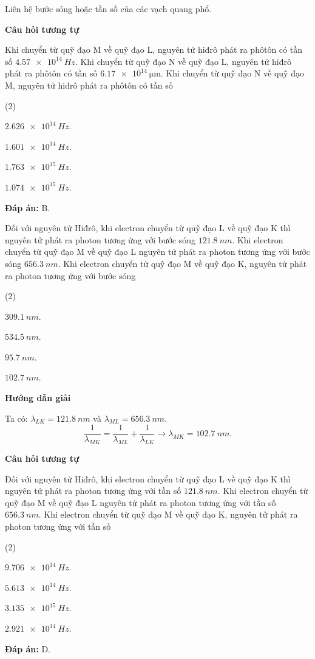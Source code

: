 \begin{dang}{Liên hệ bước sóng hoặc tần số của các vạch quang phổ.}
{		\begin{center}
			\textbf{Câu hỏi tương tự}
		\end{center}
		
		Khi chuyển từ quỹ đạo M về quỹ đạo L, nguyên tử hiđrô phát ra phôtôn có tần số $ \SI{4,57 e14}{Hz} $. Khi chuyển từ quỹ đạo N về quỹ đạo L, nguyên tử hiđrô phát ra phôtôn có tần số $\SI{6,17 e14}{\micro \meter}$. Khi chuyển từ quỹ đạo N về quỹ đạo M, nguyên tử hiđrô phát ra phôtôn có tần số
		\begin{mcq}(2)
			\item $ \SI{2,626 e14}{Hz} $.
			\item $ \SI{1,601 e14}{Hz} $.
			\item $ \SI{1,763 e15}{Hz} $.
			\item $ \SI{1,074 e15}{Hz} $.
		\end{mcq}
		
		\textbf{Đáp án:} B.}
	
	{
		Đối với nguyên tử Hiđrô, khi electron chuyển từ quỹ đạo L về quỹ đạo K thì nguyên tử phát ra photon tương ứng với bước sóng $ \SI{121,8}{nm} $. Khi electron chuyển từ quỹ đạo M về quỹ đạo L nguyên tử phát ra photon tương ứng với bước sóng $ \SI{656,3}{nm} $. Khi electron chuyển từ quỹ đạo M về quỹ đạo K, nguyên tử phát ra photon tương ứng với bước sóng
		\begin{mcq}(2)
			\item $ \SI{309,1}{nm} $.
			\item $ \SI{534,5}{nm} $.
			\item $ \SI{95,7}{nm} $.
			\item $ \SI{102,7}{nm} $.
		\end{mcq}
	}
	{
		\begin{center}
			\textbf{Hướng dẫn giải}
		\end{center}
		Ta có: $ \lambda_{LK} = \SI{121,8}{nm} $ và $ \lambda_{ML} = \SI{656,3}{nm} $. \\
		$$
		\dfrac{1}{\lambda_{MK}} = \dfrac{1}{\lambda_{ML}} + \dfrac{1}{\lambda_{LK}} \rightarrow \lambda_{MK} = \SI{102,7}{nm}.
		$$
		\begin{center}
			\textbf{Câu hỏi tương tự}
		\end{center}
		Đối với nguyên tử Hiđrô, khi electron chuyển từ quỹ đạo L về quỹ đạo K thì nguyên tử phát ra photon tương ứng với tần số $ \SI{121,8}{nm} $. Khi electron chuyển từ quỹ đạo M về quỹ đạo L nguyên tử phát ra photon tương ứng với tần số $ \SI{656,3}{nm} $. Khi electron chuyển từ quỹ đạo M về quỹ đạo K, nguyên tử phát ra photon tương ứng với tần số
		\begin{mcq}(2)
			\item $ \SI{9,706 e14}{Hz} $.
			\item $ \SI{5,613 e14}{Hz} $.
			\item $ \SI{3,135 e15}{Hz} $.
			\item $ \SI{2,921 e14}{Hz} $.
		\end{mcq}
		\textbf{Đáp án:} D.
	}
	
\end{dang}
